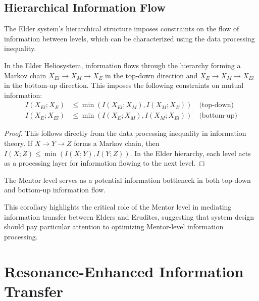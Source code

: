\subsection{Hierarchical Information Flow}

The Elder system's hierarchical structure imposes constraints on the flow of information between levels, which can be characterized using the data processing inequality.

\begin{theorem}
In the Elder Heliosystem, information flows through the hierarchy forming a Markov chain $X_{El} \rightarrow X_M \rightarrow X_E$ in the top-down direction and $X_E \rightarrow X_M \rightarrow X_{El}$ in the bottom-up direction. This imposes the following constraints on mutual information:
\begin{align}
I(X_{El}; X_E) &\leq \min(I(X_{El}; X_M), I(X_M; X_E)) \quad \text{(top-down)}\\
I(X_E; X_{El}) &\leq \min(I(X_E; X_M), I(X_M; X_{El})) \quad \text{(bottom-up)}
\end{align}
\end{theorem}

\begin{proof}
This follows directly from the data processing inequality in information theory. If $X \rightarrow Y \rightarrow Z$ forms a Markov chain, then $I(X; Z) \leq \min(I(X; Y), I(Y; Z))$. In the Elder hierarchy, each level acts as a processing layer for information flowing to the next level.
\end{proof}

\begin{corollary}
The Mentor level serves as a potential information bottleneck in both top-down and bottom-up information flow.
\end{corollary}

This corollary highlights the critical role of the Mentor level in mediating information transfer between Elders and Erudites, suggesting that system design should pay particular attention to optimizing Mentor-level information processing.

\section{Resonance-Enhanced Information Transfer}




